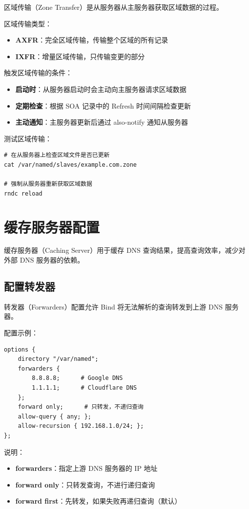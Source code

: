 \documentclass[12pt,UTF8]{ctexbook}
\begin{document}
区域传输（Zone Transfer）是从服务器从主服务器获取区域数据的过程。

区域传输类型：
\begin{itemize}
    \item \textbf{AXFR}：完全区域传输，传输整个区域的所有记录
    \item \textbf{IXFR}：增量区域传输，只传输变更的部分
\end{itemize}

触发区域传输的条件：
\begin{itemize}
    \item \textbf{启动时}：从服务器启动时会主动向主服务器请求区域数据
    \item \textbf{定期检查}：根据 SOA 记录中的 Refresh 时间间隔检查更新
    \item \textbf{主动通知}：主服务器更新后通过 also-notify 通知从服务器
\end{itemize}

测试区域传输：
\begin{verbatim}
# 在从服务器上检查区域文件是否已更新
cat /var/named/slaves/example.com.zone

# 强制从服务器重新获取区域数据
rndc reload
\end{verbatim}

\chapter{缓存服务器配置}
\label{chap:caching_server}

缓存服务器（Caching Server）用于缓存 DNS 查询结果，提高查询效率，减少对外部 DNS 服务器的依赖。

\section{配置转发器}
\label{sec:forwarders}

转发器（Forwarders）配置允许 Bind 将无法解析的查询转发到上游 DNS 服务器。

配置示例：
\begin{verbatim}
options {
    directory "/var/named";
    forwarders {
        8.8.8.8;      # Google DNS
        1.1.1.1;      # Cloudflare DNS
    };
    forward only;      # 只转发，不递归查询
    allow-query { any; };
    allow-recursion { 192.168.1.0/24; };
};
\end{verbatim}

说明：
\begin{itemize}
    \item \textbf{forwarders}：指定上游 DNS 服务器的 IP 地址
    \item \textbf{forward only}：只转发查询，不进行递归查询
    \item \textbf{forward first}：先转发，如果失败再递归查询（默认）
\end{itemize}
\end{document}
